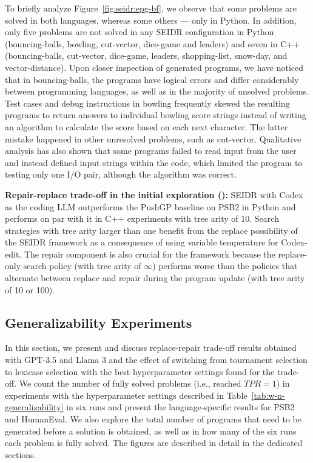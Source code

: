 To briefly analyze Figure~\ref{fig:seidr:epg-bf}, we observe that some problems are solved in both languages, whereas some others --- only in Python. 
In addition, only five problems are not solved in any SEIDR configuration in Python (bouncing-balls, bowling, cut-vector, dice-game and leaders) and seven in C++ (bouncing-balls, cut-vector, dice-game,  leaders, shopping-list, snow-day, and vector-distance).
Upon closer inspection of generated programs, we have noticed that in bouncing-balls, the programs have logical errors and differ considerably between programming languages, as well as in the majority of unsolved problems. 
Test cases and debug instructions in bowling frequently skewed the resulting programs to return answers to individual bowling score strings instead of writing an algorithm to calculate the score based on each next character.
The latter mistake happened in other unresolved problems, such as cut-vector.
Qualitative analysis has also shown that some programs failed to read input from the user and instead defined input strings within the code, which limited the program to testing only one I/O pair, although the algorithm was correct.


\begin{highlight}
\textbf{Repair-replace trade-off in the initial exploration (\rqtreearity{}):} 
SEIDR with Codex as the coding LLM outperforms the PushGP baseline on PSB2 in Python and performs on par with it in C++ experiments with tree arity of 10. 
Search strategies with tree arity larger than one benefit from the replace possibility of the SEIDR framework as a consequence of using variable temperature for Codex-edit.
The repair component is also crucial for the framework because the replace-only search policy (with tree arity of $\infty$) performs worse than the policies that alternate between replace and repair during the program update (with tree arity of 10 or 100).  
\end{highlight} 


\subsection{Generalizability Experiments}

In this section, we present and discuss replace-repair trade-off results obtained with GPT-3.5 and Llama 3 and the effect of switching from tournament selection to lexicase selection with the best hyperparameter settings found for the trade-off. 
We count the number of fully solved problems (i.e., reached $TPR=1$) in experiments with the hyperparameter settings described in Table~\ref{tab:w-n-generalizability} in six runs and present the language-specific results for PSB2 and HumanEval.
We also explore the total number of programs that need to be generated before a solution is obtained, as well as
in how many of the six runs each problem is fully solved.
The figures are described in detail in the dedicated sections. 

